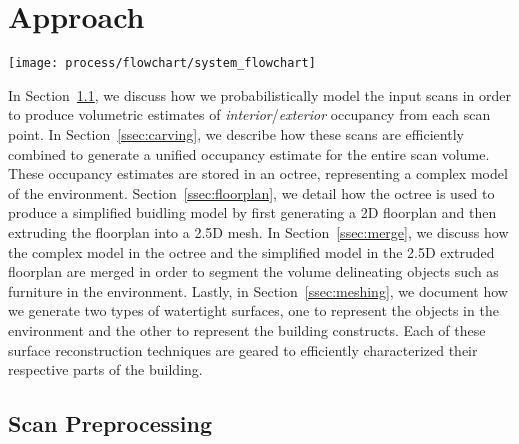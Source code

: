\documentclass[review]{acmsiggraph}
\begin{document}
\section{Approach}
\label{sec:approach}

\begin{figure*}[t]
	\centerline{\texttt{[image: process/flowchart/system\_flowchart]}}
	\caption{System flowchart of our approach.  Scan Preprocessing is described in Subsection~\ref{ssec:preprocess}, Carving is detailed in Subsection~\ref{ssec:carving}, Wall Sampling and Floor Plan Generation are discussed in Subsection~\ref{ssec:floorplan}, Merge Models is delineated in Subsection~\ref{ssec:merge}, and Planar and Detailed Meshing are documented in Subsection~\ref{ssec:meshing}.}
	\label{fig:flowchart}
\end{figure*}

In Section~\ref{ssec:preprocess}, we discuss how we probabilistically model the input scans in order to produce volumetric estimates of {\it interior}/{\it exterior} occupancy from each scan point.  In Section~\ref{ssec:carving}, we describe how these scans are efficiently combined to generate a unified occupancy estimate for the entire scan volume.  These occupancy estimates are stored in an octree, representing a complex model of the environment.  Section~\ref{ssec:floorplan}, we detail how the octree is used to produce a simplified buidling model by first generating a 2D floorplan and then extruding the floorplan into a 2.5D mesh.  In Section~\ref{ssec:merge}, we discuss how the complex model in the octree and the simplified model in the 2.5D extruded floorplan are merged in order to segment the volume delineating objects such as furniture in the environment.  Lastly, in Section~\ref{ssec:meshing}, we document how we generate two types of watertight surfaces, one to represent the objects in the environment and the other to represent the building constructs.  Each of these surface reconstruction techniques are geared to efficiently characterized their respective parts of the building.

\subsection{Scan Preprocessing}
\label{ssec:preprocess}
\end{document}
